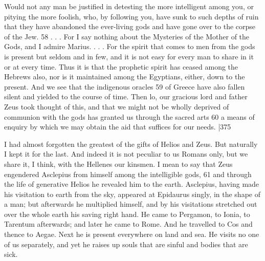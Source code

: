 Would not any man be justified in detesting the more intelligent among you, or pitying the more foolish, who, by following you, have sunk to such depths of ruin that they have abandoned the ever-living gods and have gone over to the corpse of the Jew. 58 . . . For I say nothing about the Mysteries of the Mother of the Gods, and I admire Marius. . . . For the spirit that comes to men from the gods is present but seldom and in few, and it is not easy for every man to share in it or at every time. Thus it is that the prophetic spirit has ceased among the Hebrews also, nor is it maintained among the Egyptians, either, down to the present. And we see that the indigenous oracles
59 of Greece have also fallen silent and yielded to the course of time. Then lo, our gracious lord and father Zeus took thought of this, and that we might not be wholly deprived of communion with the gods has granted us through the sacred arts
60 a means of enquiry by which we may obtain the aid that suffices for our needs.
|375

I had almost forgotten the greatest of the gifts of Helios and Zeus. But naturally I kept it for the last. And indeed it is not peculiar to us Romans only, but we share it, I think, with the Hellenes our kinsmen. I mean to say that Zeus engendered Asclepius from himself among the intelligible gods, 61
and through the life of generative Helios he revealed him to the earth. Asclepius, having made his visitation to earth from the sky, appeared at Epidaurus singly, in the shape of a man; but afterwards he multiplied himself, and by his visitations stretched out over the whole earth his saving right hand. He came to Pergamon, to Ionia, to Tarentum afterwards; and later he came to Rome. And he travelled to Cos and thence to Aegae. Next he is present everywhere on land and sea. He visits no one of us separately, and yet he raises up souls that are sinful and bodies that are sick.

